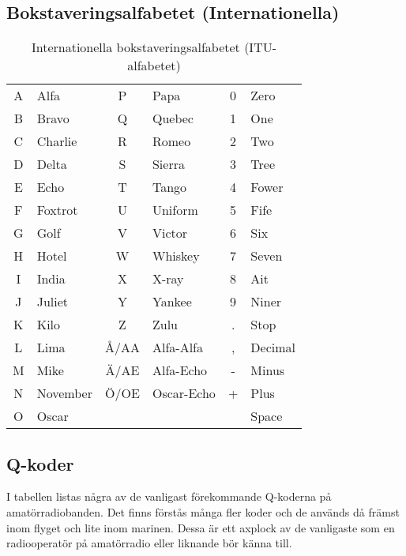 \subsection{Bokstaveringsalfabetet (Internationella)}
\begin{table}[H]
\centering
\begin{tabular}{cl|cl|cl}
	A & Alfa     &  P   & Papa       & 0 & Zero    \\
	B & Bravo    &  Q   & Quebec     & 1 & One     \\
	C & Charlie  &  R   & Romeo      & 2 & Two     \\
	D & Delta    &  S   & Sierra     & 3 & Tree    \\
	E & Echo     &  T   & Tango      & 4 & Fower   \\
	F & Foxtrot  &  U   & Uniform    & 5 & Fife    \\
	G & Golf     &  V   & Victor     & 6 & Six     \\
	H & Hotel    &  W   & Whiskey    & 7 & Seven   \\
	I & India    &  X   & X-ray      & 8 & Ait     \\
	J & Juliet   &  Y   & Yankee     & 9 & Niner   \\
	K & Kilo     &  Z   & Zulu       & . & Stop    \\
	L & Lima     & Å/AA & Alfa-Alfa  & , & Decimal \\
	M & Mike     & Ä/AE & Alfa-Echo  & - & Minus   \\
	N & November & Ö/OE & Oscar-Echo & + & Plus    \\
	O & Oscar    &      &            &   & Space   \\
\end{tabular}
\caption{Internationella bokstaveringsalfabetet (ITU-alfabetet)}
\end{table}

\clearpage

\subsection{Q-koder}
I tabellen listas några av de vanligast förekommande Q-koderna på
amatörradiobanden.  Det finns förstås många fler koder och de används då
främst inom flyget och lite inom marinen. Dessa är ett axplock av de
vanligaste som en radiooperatör på amatörradio eller liknande bör känna till.


